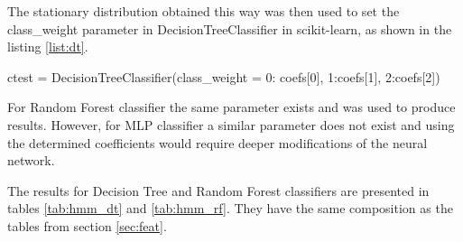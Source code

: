 The stationary distribution obtained this way was then used to set the class\_weight parameter in DecisionTreeClassifier in scikit-learn, as shown in the listing \ref{list:dt}.

\begin{python}[caption = {Definition of the Decision Tree Classifier taking into consideration the stationary distribution}, label = list:dt]
ctest = DecisionTreeClassifier(class_weight = {0: coefs[0], 1:coefs[1], 2:coefs[2]})  
\end{python}

For Random Forest classifier the same parameter exists and was used to produce results. However, for MLP classifier a similar parameter does not exist and using the determined coefficients would require deeper modifications of the neural network.

The results for Decision Tree and Random Forest classifiers are presented in tables \ref{tab:hmm_dt} and \ref{tab:hmm_rf}. They have the same composition as the tables from section \ref{sec:feat}.

